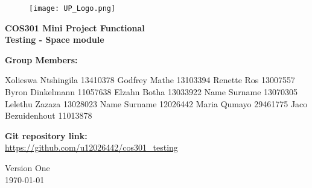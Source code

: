 \begin{titlepage}
	\begin{center}
		
		\begin{figure}[t]
			\centering
			\texttt{[image: UP\_Logo.png]}
		\end{figure}		
		
		\textbf{\LARGE COS301 Mini Project Functional \\Testing - Space module\\}
		
		\vspace{1 cm}
		
		\LARGE{\textbf{Group Members: }}
		

		\begin{flushright} \large
			Xolieswa Ntshingila 13410378\newline
			Godfrey Mathe 13103394 \newline
			Renette Ros 13007557\newline
			Byron Dinkelmann 11057638\newline
			Elzahn Botha 13033922\newline
			Name Surname 13070305\newline
			Lelethu Zazaza 13028023\newline
			Name Surname 12026442\newline
			Maria Qumayo 29461775\newline
			Jaco Bezuidenhout 11013878\newline
		\end{flushright}
		
	
		
		\textbf{Git repository link:\\}
		 \url{ https://github.com/u12026442/cos301_testing}
		
		\vfill
		
		{\LARGE Version One}
		\\
		{\large \today}		
		
		
	\end{center}
\end{titlepage}
